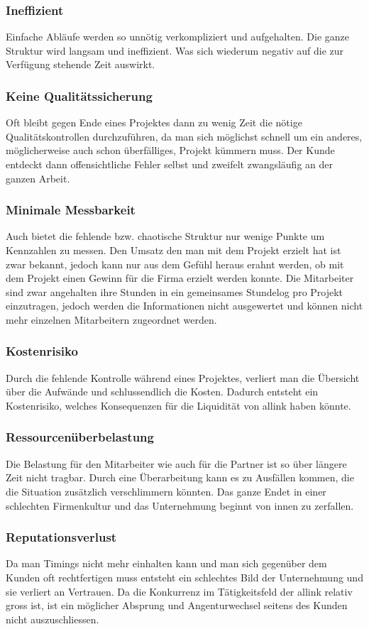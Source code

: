 \subsubsection{Ineffizient}
Einfache Abläufe werden so unnötig verkompliziert und aufgehalten. Die ganze
Struktur wird langsam und ineffizient. Was sich wiederum negativ auf die zur
Verfügung stehende Zeit auswirkt.

\subsubsection{Keine Qualitätssicherung}
Oft bleibt gegen Ende eines Projektes dann zu wenig Zeit die nötige 
Qualitätskontrollen durchzuführen, da man sich möglichst schnell um ein anderes,
möglicherweise auch schon überfälliges, Projekt kümmern muss. Der Kunde entdeckt
dann offensichtliche Fehler selbst und zweifelt zwangsläufig an der ganzen Arbeit.

\subsubsection{Minimale Messbarkeit}
Auch bietet die fehlende bzw. chaotische Struktur nur wenige Punkte um Kennzahlen
zu messen. Den Umsatz den man mit dem Projekt erzielt hat ist zwar bekannt,
jedoch kann nur aus dem Gefühl heraus erahnt werden, ob mit dem Projekt einen
Gewinn für die Firma erzielt werden konnte. Die Mitarbeiter sind zwar angehalten
ihre Stunden in ein gemeinsames Stundelog pro Projekt einzutragen, jedoch werden
die Informationen nicht ausgewertet und können nicht mehr einzelnen Mitarbeitern
zugeordnet werden.

\subsubsection{Kostenrisiko}
Durch die fehlende Kontrolle während eines Projektes, verliert man die
Übersicht über die Aufwände und schlussendlich die Kosten. Dadurch entsteht
ein Kostenrisiko, welches Konsequenzen für die Liquidität von allink haben könnte.

\subsubsection{Ressourcenüberbelastung}
Die Belastung für den Mitarbeiter wie auch für die Partner ist so über
längere Zeit nicht tragbar. Durch eine Überarbeitung kann es zu Ausfällen kommen, die
die Situation zusätzlich verschlimmern könnten. Das ganze Endet in einer 
schlechten Firmenkultur und das Unternehmung beginnt von innen zu zerfallen.

\subsubsection{Reputationsverlust}
Da man Timings nicht mehr einhalten kann und man sich gegenüber dem Kunden
oft rechtfertigen muss entsteht ein schlechtes Bild der Unternehmung und sie
verliert an Vertrauen. Da die Konkurrenz im Tätigkeitsfeld der allink relativ
gross ist, ist ein möglicher Absprung und Angenturwechsel seitens des Kunden nicht 
auszuschliessen.
